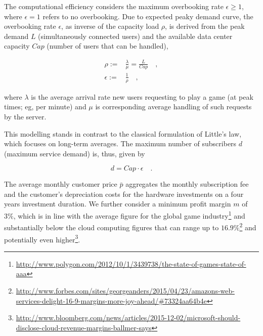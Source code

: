 The computational efficiency considers the maximum overbooking rate $\epsilon \geq 1$, where $\epsilon = 1$ refers to no overbooking. Due to expected peaky demand curve, the overbooking rate $\epsilon$, as inverse of the capacity load $\rho$, is derived from the peak demand $L$ (simultaneously connected users) and the available data center capacity $Cap$ (number of users that can be handled),

\begin{align}
	\rho :=& \frac{\lambda}{\mu} = \frac{L}{Cap} \quad, \\
	\epsilon :=& \frac{1}{\rho} \quad,
\end{align}

where $\lambda$ is the average arrival rate new users requesting to play a game (at peak times; eg, per minute) and $\mu$ is corresponding average handling of such requests by the server. 

This modelling stands in contrast to the classical formulation of Little's law, which focuses on long-term averages. The maximum number of subscribers $d$ (maximum service demand) is, thus, given by

\begin{equation}
	 d = Cap \cdot \epsilon \quad .
\end{equation}

The average monthly customer price $\bar{p}$ aggregates the monthly subscription fee and the customer's depreciation costs for the hardware investments on a four years investment duration. We further consider a minimum profit margin $m$ of $3 \%$, which is in line with the average figure for the global game industry\footnote{\url{http://www.polygon.com/2012/10/1/3439738/the-state-of-games-state-of-aaa}} and substantially below the cloud computing figures that can range up to $16.9\%$\footnote{\url{http://www.forbes.com/sites/georgeanders/2015/04/23/amazons-web-services-delight-16-9-margins-more-joy-ahead/\#73324aa64b4e}} and potentially even higher\footnote{\url{http://www.bloomberg.com/news/articles/2015-12-02/microsoft-should-disclose-cloud-revenue-margins-ballmer-says}}.


